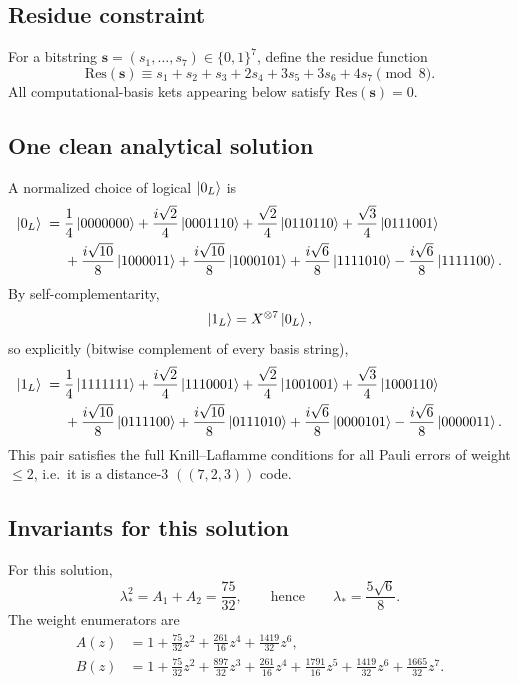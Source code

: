 \documentclass[11pt]{article}
\begin{document}
\subsection{Residue constraint}
For a bitstring \(\mathbf{s}=(s_1,\dots,s_7)\in\{0,1\}^7\), define the residue function
\[
\mathrm{Res}(\mathbf{s}) \equiv s_1+s_2+s_3+2s_4+3s_5+3s_6+4s_7 \pmod 8.
\]
All computational-basis kets appearing below satisfy \(\mathrm{Res}(\mathbf{s})=0\).

\subsection{One clean analytical solution}
A normalized choice of logical \(\ket{0_L}\) is
\begin{align*}
\ket{0_L} \;=\;&
\frac{1}{4}\ket{0000000}
+\frac{i\sqrt2}{4}\ket{0001110}
+\frac{\sqrt2}{4}\ket{0110110}
+\frac{\sqrt3}{4}\ket{0111001}\\
&+\frac{i\sqrt{10}}{8}\ket{1000011}
+\frac{i\sqrt{10}}{8}\ket{1000101}
+\frac{i\sqrt6}{8}\ket{1111010}
-\frac{i\sqrt6}{8}\ket{1111100}.
\end{align*}
By self-complementarity,
\[
\ket{1_L} = X^{\otimes 7}\ket{0_L},
\]
so explicitly (bitwise complement of every basis string),
\begin{align*}
\ket{1_L} \;=\;&
\frac{1}{4}\ket{1111111}
+\frac{i\sqrt2}{4}\ket{1110001}
+\frac{\sqrt2}{4}\ket{1001001}
+\frac{\sqrt3}{4}\ket{1000110}\\
&+\frac{i\sqrt{10}}{8}\ket{0111100}
+\frac{i\sqrt{10}}{8}\ket{0111010}
+\frac{i\sqrt6}{8}\ket{0000101}
-\frac{i\sqrt6}{8}\ket{0000011}.
\end{align*}
This pair satisfies the full Knill--Laflamme conditions for all Pauli errors of weight \(\le 2\),
i.e.\ it is a distance-\(3\) \(((7,2,3))\) code.

\subsection{Invariants for this solution}
For this solution,
\[
\lambda_*^2 = A_1 + A_2 = \frac{75}{32},
\qquad\text{hence}\qquad
\lambda_* = \frac{5\sqrt6}{8}.
\]
The weight enumerators are
\begin{align*}
A(z) &= 1+\frac{75}{32}z^2+\frac{261}{16}z^4+\frac{1419}{32}z^6,\\
B(z) &= 1+\frac{75}{32}z^2+\frac{897}{32}z^3+\frac{261}{16}z^4+\frac{1791}{16}z^5+\frac{1419}{32}z^6+\frac{1665}{32}z^7.
\end{align*}
\end{document}
